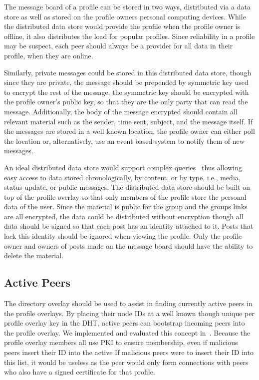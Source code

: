 \documentclass[letterpaper,twocolumn,10pt]{article}
\begin{document}
The message board of a profile can be stored in two ways, distributed via a
data store as well as stored on the profile owners personal computing devices.
While the distributed data store would provide the profile when the profile
owner is offline, it also distributes the load for popular profiles.  Since
reliability in a profile may be suspect, each peer should always be a provider
for all data in their profile, when they are online.

Similarly, private messages could be stored in this distributed data store,
though since they are private, the message should be prepended by symmetric
key used to encrypt the rest of the message.  the symmetric key should be
encrypted with the profile owner's public key, so that they are the only party
that can read the message.  Additionally, the body of the message encrypted
should contain all relevant material such as the sender, time sent, subject,
and the message itself.  If the messages are stored in a well known location,
the profile owner can either poll the location or, alternatively, use an event
based system to notify them of new messages.

An ideal distributed data store would support complex queries~\cite{complex_queries}
thus allowing easy access to data stored chronologically, by content, or by type,
i.e., media, status update, or public messages.  The distributed data store
should be built on top of the profile overlay so that only members of the
profile store the personal data of the user.  Since the material is public for
the group and the groups links are all encrypted, the data could be distributed
without encryption though all data should be signed so that each post has an
identity attached to it.  Posts that lack this identity should be ignored when
viewing the profile.  Only the profile owner and owners of posts made on the
message board should have the ability to delete the material.

\subsection{Active Peers}
The directory overlay should be used to assist in finding currently active peers
in the profile overlays.  By placing their node IDs at a well known though unique
per profile overlay key in the DHT, active peers can bootstrap incoming peers
into the profile overlay.  We implemented and evaluated this concept
in~\cite{icdcs10}.  Because the profile overlay members all use PKI to ensure
membership, even if malicious peers insert their ID into the active If malicious
peers were to insert their ID into this list, it would be useless as the peer
would only form connections with peers who also have a signed certificate for
that profile.
\end{document}
